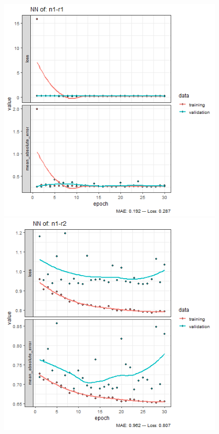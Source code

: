 \documentclass{FR16}
\begin{document}
\newpage
\begin{figure}[!htb]
   \begin{minipage}{0.33\textwidth}
     \centering
     \includegraphics[width=1\linewidth]{figures/NN-n1-r1.png} 
   \end{minipage}\hfill
   \begin{minipage}{0.33\textwidth}
     \centering
     \includegraphics[width=1\linewidth]{figures/NN-n1-r2.png}

\end{minipage}
\end{figure}
\end{document}
